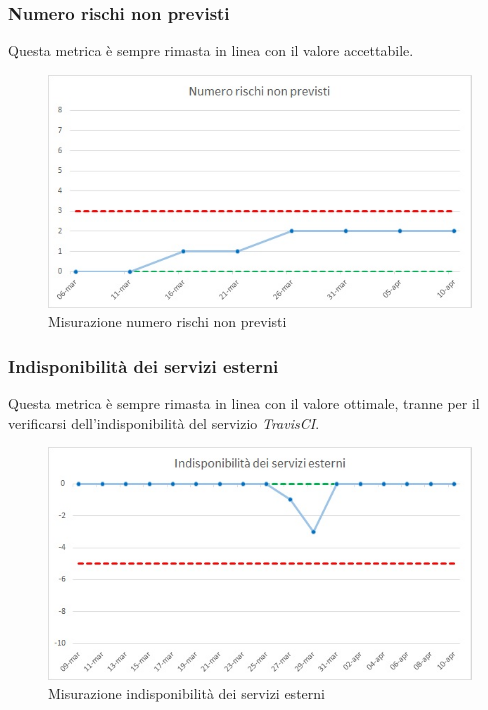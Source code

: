 \subsubsection{Numero rischi non previsti}
Questa metrica è sempre rimasta in linea con il valore accettabile.
\begin{figure} [H]
	\centering
	\includegraphics[scale=1]{Img/rischi}
	\caption{Misurazione numero rischi non previsti}\label{}
\end{figure}

\subsubsection{Indisponibilità dei servizi esterni}
Questa metrica è sempre rimasta in linea con il valore ottimale, tranne per il verificarsi dell'indisponibilità del servizio \emph{TravisCI}.
\begin{figure} [H]
	\centering
	\includegraphics[scale=1]{Img/indisp}
	\caption{Misurazione indisponibilità dei servizi esterni}\label{}
\end{figure}


